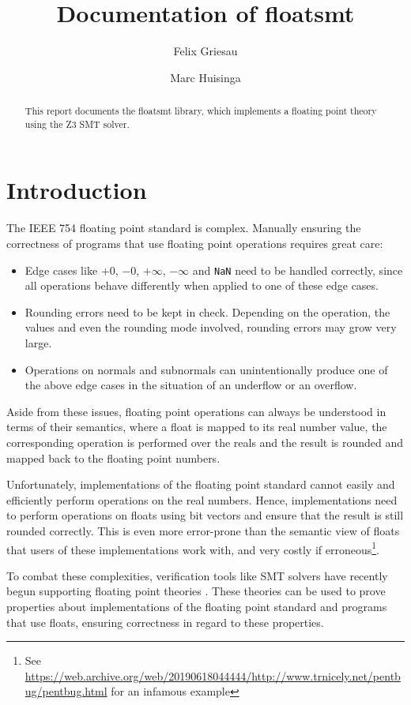 \documentclass[a4paper,UKenglish,cleveref, autoref, thm-restate]{lipics-v2019}
\title{Documentation of floatsmt}
\author{Felix Griesau}{Karlsruhe Institute of Technology, Germany}{felix.griesau@student.kit.edu}{}{}
\author{Marc Huisinga}{Karlsruhe Institute of Technology, Germany}{mhuisi@protonmail.com}{}{}
\begin{document}
\maketitle

\begin{abstract}
This report documents the floatsmt library, which implements a floating point theory using the Z3 SMT solver. 
\end{abstract}


\section{Introduction}
The IEEE 754 floating point standard \cite{ieee} is complex. Manually ensuring the correctness of programs that use floating point operations requires great care: 
\begin{itemize}
\item Edge cases like $+0$, $-0$, $+\infty$, $-\infty$ and \verb|NaN| need to be handled correctly, since all operations behave differently when applied to one of these edge cases.
\item Rounding errors need to be kept in check. Depending on the operation, the values and even the rounding mode involved, rounding errors may grow very large.
\item Operations on normals and subnormals can unintentionally produce one of the above edge cases in the situation of an underflow or an overflow.
\end{itemize}
Aside from these issues, floating point operations can always be understood in terms of their semantics, where a float is mapped to its real number value, the corresponding operation is performed over the reals and the result is rounded and mapped back to the floating point numbers.

Unfortunately, implementations of the floating point standard cannot easily and efficiently perform operations on the real numbers. Hence, implementations need to perform operations on floats using bit vectors and ensure that the result is still rounded correctly. This is even more error-prone than the semantic view of floats that users of these implementations work with, and very costly if erroneous\footnote{See \url{https://web.archive.org/web/20190618044444/http://www.trnicely.net/pentbug/pentbug.html} for an infamous example}. 

To combat these complexities, verification tools like SMT solvers have recently begun supporting floating point theories \cite{semantics}. These theories can be used to prove properties about implementations of the floating point standard and programs that use floats, ensuring correctness in regard to these properties.
\end{document}
